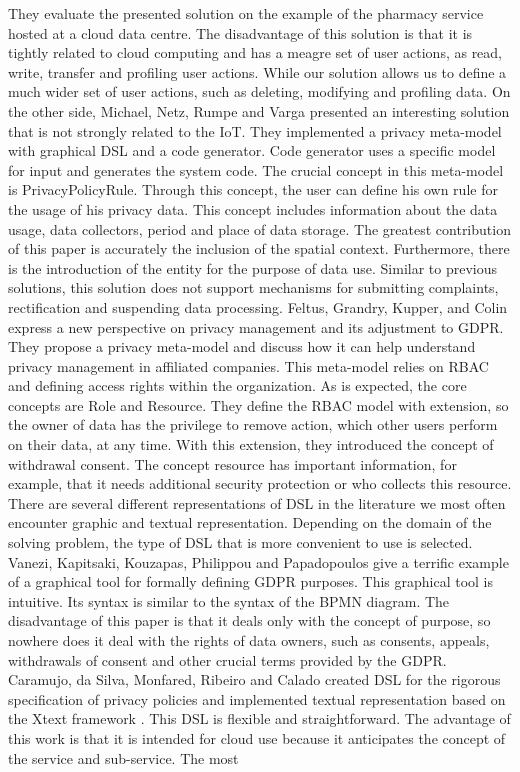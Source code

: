 \documentclass[11pt,english]{article}
\begin{document}
They evaluate the presented solution on the example of the pharmacy service hosted at a cloud data centre. The disadvantage of this solution is that it is tightly related to cloud computing and has a meagre set of user actions, as read, write, transfer and profiling user actions. While our solution allows us to define a much wider set of user actions, such as deleting, modifying and profiling data. On the other side, Michael, Netz, Rumpe and Varga \cite{michael2019towards} presented an interesting solution that is not strongly related to the IoT. They implemented a privacy meta-model with graphical DSL and a code generator. Code generator uses a specific model for input and generates the system code. The crucial concept in this meta-model is PrivacyPolicyRule. Through this concept, the user can define his own rule for the usage of his privacy data. This concept includes information about the data usage, data collectors, period and place of data storage. The greatest contribution of this paper is accurately the inclusion of the spatial context. Furthermore, there is the introduction of the entity for the purpose of data use. Similar to previous solutions, this solution does not support mechanisms for submitting complaints, rectification and suspending data processing. \newline Feltus, Grandry, Kupper, and Colin \cite{feltus2017model} express a new perspective on privacy management and its adjustment to GDPR. They propose a privacy meta-model and discuss how it can help understand privacy management in affiliated companies. This meta-model relies on RBAC and defining access rights within the organization. As is expected, the core concepts are Role and Resource. They define the RBAC model with extension, so the owner of data has the privilege to remove action, which other users perform on their data, at any time. With this extension, they introduced the concept of withdrawal consent. The concept resource has important information, for example, that it needs additional security protection or who collects this resource. \newline There are several different representations of DSL in the literature we most often encounter graphic and textual representation. Depending on the domain of the solving problem, the type of DSL that is more convenient to use is selected. Vanezi, Kapitsaki, Kouzapas, Philippou and Papadopoulos \cite{vanezi2020dialogop} give a terrific example of a graphical tool for formally defining GDPR purposes. This graphical tool is intuitive. Its syntax is similar to the syntax of the BPMN diagram. The disadvantage of this paper is that it deals only with the concept of purpose, so nowhere does it deal with the rights of data owners, such as consents, appeals, withdrawals of consent and other crucial terms provided by the GDPR. Caramujo, da Silva, Monfared, Ribeiro and Calado \cite{caramujo2019rsl} created DSL for the rigorous specification of privacy policies and implemented textual representation based on the Xtext framework \cite{bettini2016implementing}. This DSL is flexible and straightforward. The advantage of this work is that it is intended for cloud use because it anticipates the concept of the service and sub-service. The most 
\end{document}
